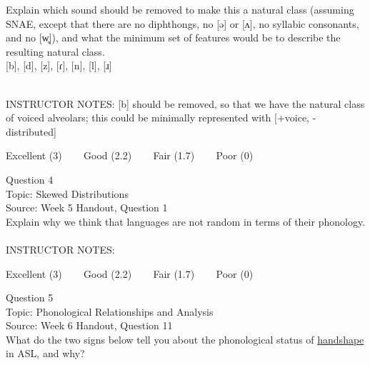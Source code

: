 \documentclass[12pt]{article}
\begin{document}
Explain which sound should be removed to make this a natural class (assuming SNAE, except that there are no diphthongs, no [ə] or [ʌ], no syllabic consonants, and no [w̥]), and what the minimum set of features would be to describe the resulting natural class.\\

{[b]}, {[d]}, {[z]}, {[ɾ]}, {[n]}, {[l]}, {[ɹ]}


~\\
INSTRUCTOR NOTES: [b] should be removed, so that we have the natural class of voiced alveolars; this could be minimally represented with [+voice, -distributed]


\vfill
Excellent (3) ~~~ Good (2.2) ~~~ Fair (1.7) ~~~ Poor (0)
\newpage

{\large Question 4}\\

Topic: Skewed Distributions\\
Source: Week 5 Handout, Question 1\\

Explain why we think that languages are not random in terms of their phonology.\\


~\\
INSTRUCTOR NOTES: 


\vfill
Excellent (3) ~~~ Good (2.2) ~~~ Fair (1.7) ~~~ Poor (0)
\newpage

{\large Question 5}\\

Topic: Phonological Relationships and Analysis\\
Source: Week 6 Handout, Question 11\\

What do the two signs below tell you about the phonological status of \underline{handshape} in ASL, and why?\\
\end{document}
